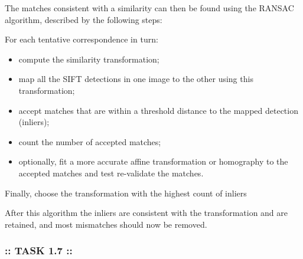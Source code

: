 \documentclass[11pt]{article}
\providecommand{\tightlist}{%
      \setlength{\itemsep}{0pt}\setlength{\parskip}{0pt}}
\begin{document}
    The matches consistent with a similarity can then be found using the
RANSAC algorithm, described by the following steps:

For each tentative correspondence in turn:

\begin{itemize}
\tightlist
\item
  compute the similarity transformation;
\item
  map all the SIFT detections in one image to the other using this
  transformation;
\item
  accept matches that are within a threshold distance to the mapped
  detection (inliers);
\item
  count the number of accepted matches;
\item
  optionally, fit a more accurate affine transformation or homography to
  the accepted matches and test re-validate the matches.
\end{itemize}

Finally, choose the transformation with the highest count of inliers

After this algorithm the inliers are consistent with the transformation
and are retained, and most mismatches should now be removed.

    \hypertarget{task-1.7}{%
\subsubsection{:: TASK 1.7 ::}\label{task-1.7}}
\end{document}

